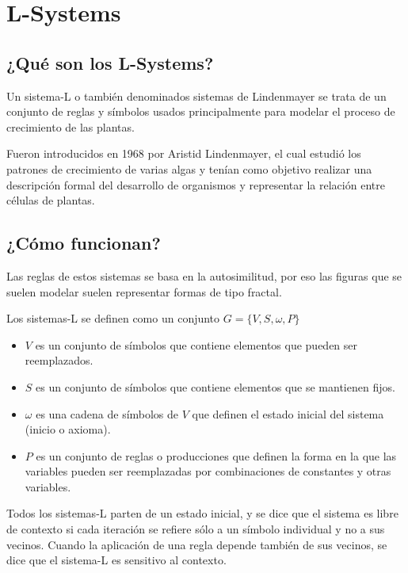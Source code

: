 \chapter{L-Systems}

\section{¿Qué son los L-Systems?}

\noindent Un sistema-L o también denominados sistemas de Lindenmayer se trata de un conjunto de reglas y símbolos usados principalmente para modelar el proceso de crecimiento de las plantas.

\noindent Fueron introducidos en 1968 por Aristid Lindenmayer, el cual estudió los patrones de crecimiento de varias algas y tenían como objetivo realizar una descripción formal del desarrollo de organismos y representar la relación entre células de plantas.

\section{¿Cómo funcionan?}

\noindent Las reglas de estos sistemas se basa en la autosimilitud, por eso las figuras que se suelen modelar suelen representar formas de tipo fractal.

\noindent Los sistemas-L se definen como un conjunto $G=\{V,S, \omega ,P\}$

\begin{itemize}
    \item $V$ es un conjunto de símbolos que contiene elementos que pueden ser reemplazados.
    \item $S$ es un conjunto de símbolos que contiene elementos que se mantienen fijos.
    \item $\omega$ es una cadena de símbolos de $V$ que definen el estado inicial del sistema (inicio o axioma).
    \item $P$ es un conjunto de reglas o producciones que definen la forma en la que las variables pueden ser reemplazadas por combinaciones de constantes y otras variables.
\end{itemize}

\noindent Todos los sistemas-L parten de un estado inicial, y se dice que el sistema es libre de contexto si cada iteración se refiere sólo a un símbolo individual y no a sus vecinos. Cuando la aplicación de una regla depende también de sus vecinos, se dice que el sistema-L es sensitivo al contexto.

